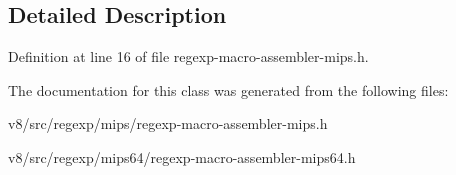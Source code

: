 \subsection{Detailed Description}


Definition at line 16 of file regexp-\/macro-\/assembler-\/mips.\+h.



The documentation for this class was generated from the following files\+:\begin{DoxyCompactItemize}
\item 
v8/src/regexp/mips/regexp-\/macro-\/assembler-\/mips.\+h\item 
v8/src/regexp/mips64/regexp-\/macro-\/assembler-\/mips64.\+h\end{DoxyCompactItemize}
